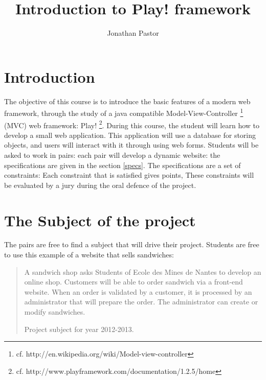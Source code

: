 \documentclass{article}         %
\title{Introduction to Play! framework}     %
\author{Jonathan Pastor}        %
\begin{document}

\maketitle                        %


\section{Introduction}

The objective of this course is to introduce the basic features of a modern web framework, through the study of a java compatible Model-View-Controller \footnote{cf. http://en.wikipedia.org/wiki/Model-view-controller} (MVC) web framework: Play! \footnote{cf. http://www.playframework.com/documentation/1.2.5/home}.
\newline
\newline
During this course, the student will learn how to develop a small web application. This application will use a database for storing objects, and users will interact with it through using web forms.
\newline
\newline
Students will be asked to work in pairs: each pair will develop a dynamic website: the specifications are given in the section \ref{specs}. The specifications are a set of constraints: Each constraint that is satisfied gives points, These constraints will be evaluated by a jury during the oral defence of the project.



\section{The Subject of the project}

The pairs are free to find a subject that will drive their project. Students are free to use this example of a website that sells sandwiches: 

\begin{quotation}
A sandwich shop asks Students of Ecole des Mines de Nantes to develop an online shop. Customers will be able to order sandwich via a front-end website. When an order is validated by a customer, it is processed by an administrator that will prepare the order. The administrator can create or modify sandwiches. \par
\raggedleft Project subject for year 2012-2013.
\end{quotation}
\end{document}

